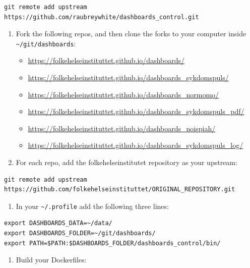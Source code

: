 \documentclass[12pt,]{article}
\providecommand{\tightlist}{%
  \setlength{\itemsep}{0pt}\setlength{\parskip}{0pt}}
\begin{document}
\begin{verbatim}
git remote add upstream https://github.com/raubreywhite/dashboards_control.git
\end{verbatim}

\begin{enumerate}
\def\labelenumi{\arabic{enumi}.}
\setcounter{enumi}{4}
\tightlist
\item
  Fork the following repos, and then clone the forks to your computer
  inside \texttt{\textasciitilde{}/git/dashboards}:

  \begin{itemize}
  \tightlist
  \item
    \url{https://folkehelseinstituttet.github.io/dashboards/}
  \item
    \url{https://folkehelseinstituttet.github.io/dashboards_sykdomspuls/}
  \item
    \url{https://folkehelseinstituttet.github.io/dashboards_normomo/}
  \item
    \url{https://folkehelseinstituttet.github.io/dashboards_sykdomspuls_pdf/}
  \item
    \url{https://folkehelseinstituttet.github.io/dashboards_noispiah/}
  \item
    \url{https://folkehelseinstituttet.github.io/dashboards_sykdomspuls_log/}
  \end{itemize}
\item
  For each repo, add the folkehelseinstitutet repository as your
  upstream:
\end{enumerate}

\begin{verbatim}
git remote add upstream https://github.com/folkehelseinstituttet/ORIGINAL_REPOSITORY.git
\end{verbatim}

\begin{enumerate}
\def\labelenumi{\arabic{enumi}.}
\setcounter{enumi}{6}
\tightlist
\item
  In your \texttt{\textasciitilde{}/.profile} add the following three
  lines:
\end{enumerate}

\begin{verbatim}
export DASHBOARDS_DATA=~/data/
export DASHBOARDS_FOLDER=~/git/dashboards/
export PATH=$PATH:$DASHBOARDS_FOLDER/dashboards_control/bin/
\end{verbatim}

\begin{enumerate}
\def\labelenumi{\arabic{enumi}.}
\setcounter{enumi}{7}
\tightlist
\item
  Build your Dockerfiles:
\end{enumerate}
\end{document}
